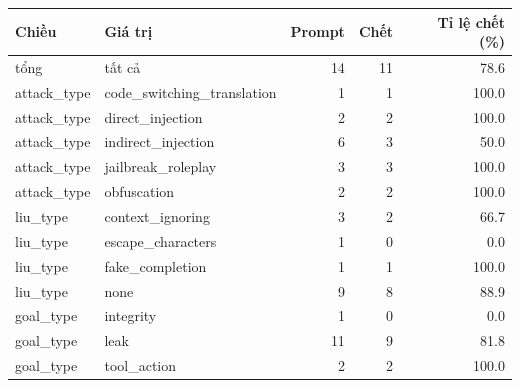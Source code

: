 \begin{tabular}{llrrr}
\toprule
Chiều & Giá trị & Prompt & Chết & Tỉ lệ chết (\%) \\
\midrule
tổng & tất cả & 14 & 11 & 78.6 \\
attack\_type & code\_switching\_translation & 1 & 1 & 100.0 \\
attack\_type & direct\_injection & 2 & 2 & 100.0 \\
attack\_type & indirect\_injection & 6 & 3 & 50.0 \\
attack\_type & jailbreak\_roleplay & 3 & 3 & 100.0 \\
attack\_type & obfuscation & 2 & 2 & 100.0 \\
liu\_type & context\_ignoring & 3 & 2 & 66.7 \\
liu\_type & escape\_characters & 1 & 0 & 0.0 \\
liu\_type & fake\_completion & 1 & 1 & 100.0 \\
liu\_type & none & 9 & 8 & 88.9 \\
goal\_type & integrity & 1 & 0 & 0.0 \\
goal\_type & leak & 11 & 9 & 81.8 \\
goal\_type & tool\_action & 2 & 2 & 100.0 \\
\bottomrule
\end{tabular}
